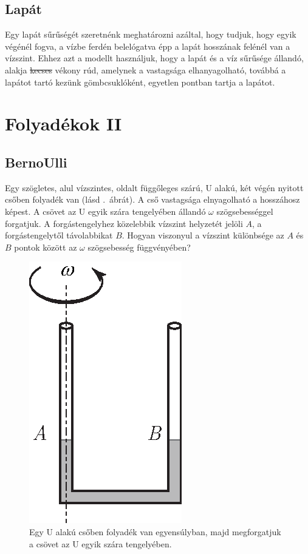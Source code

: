 \documentclass[12pt,a4paper]{scrartcl}
\begin{document}
\subsection{Lapát}
Egy lapát sűrűségét szeretnénk meghatározni azáltal, hogy tudjuk, hogy egyik végénél fogva, a vízbe ferdén belelógatva épp a lapát hosszának felénél van a vízszint. Ehhez azt a modellt használjuk, hogy a lapát és a víz sűrűsége állandó, alakja \sout{kecses} vékony rúd, amelynek a vastagsága elhanyagolható, továbbá a lapátot tartó kezünk gömbcsuklóként, egyetlen pontban tartja a lapátot.


\section{Folyadékok II}
\subsection{BernoUlli}
Egy szögletes, alul vízszintes, oldalt függőleges szárú, U alakú, két végén nyitott csőben folyadék van (lásd .\ ábrát). A cső vastagsága elnyagolható a hosszáhosz képest. A csövet az U egyik szára tengelyében állandó $\omega$ szögsebességgel forgatjuk. A forgástengelyhez közelebbik vízszint helyzetét jelöli $A$, a forgástengelytől távolabbikat $B$. Hogyan viszonyul a vízszint különbsége az $A$ és $B$ pontok között az $\omega$ szögsebesség függvényében?

\begin{figure}[htb] 
\centering    
\includegraphics[scale=1]{figs/bernoUlli.eps}
\caption{Egy U alakú csőben folyadék van egyensúlyban, majd megforgatjuk a csövet az U egyik szára tengelyében.}
\label{fig:ucsoves}
\end{figure}
\FloatBarrier
\end{document}

